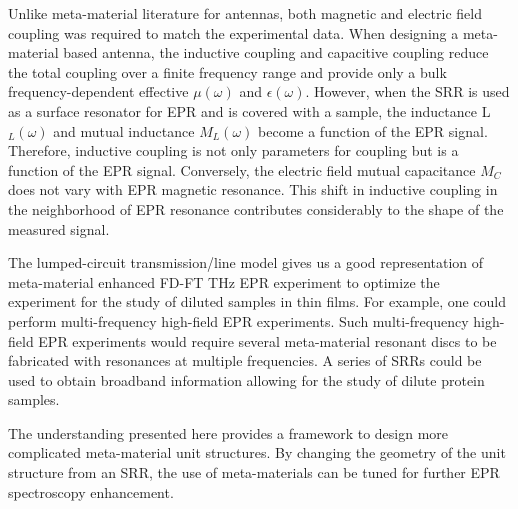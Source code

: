 Unlike meta-material literature for antennas, both magnetic and electric field coupling was required to match the experimental data. When designing a meta-material based antenna, the inductive coupling and capacitive coupling reduce the total coupling over a finite frequency range and provide only a bulk frequency-dependent effective $\mu(\omega)$ and $\epsilon(\omega)$. However, when the SRR is used as a surface resonator for EPR and is covered with a sample, the inductance L$_L(\omega)$ and mutual inductance $M_L(\omega)$ become a function of the EPR signal. Therefore, inductive coupling is not only parameters for coupling but is a function of the EPR signal. Conversely, the electric field mutual capacitance $M_C$ does not vary with EPR magnetic resonance. This shift in inductive coupling in the neighborhood of EPR resonance contributes considerably to the shape of the measured signal.

The lumped-circuit transmission\-/line model gives us a good representation of meta-material enhanced FD-FT THz EPR experiment to optimize the experiment for the study of diluted samples in thin films. For example, one could perform multi-frequency high-field EPR experiments. \cite{KRZYSTEK2006,Telser2014} Such multi-frequency high-field EPR experiments would require several meta-material resonant discs to be fabricated with resonances at multiple frequencies. A series of SRRs could be used to obtain broadband information allowing for the study of dilute protein samples.

The understanding presented here provides a framework to design more complicated meta-material unit structures. By changing the geometry of the unit structure from an SRR, the use of meta-materials can be tuned for further EPR spectroscopy enhancement. \cite{ZhangMetasurfaces}


{\renewcommand{\bibsection}{\clearpage\section*{\bibname}\markboth{\bibname}{\bibname}}
\renewcommand{\bibname}{CHAPTER 4. REFERENCES}


}